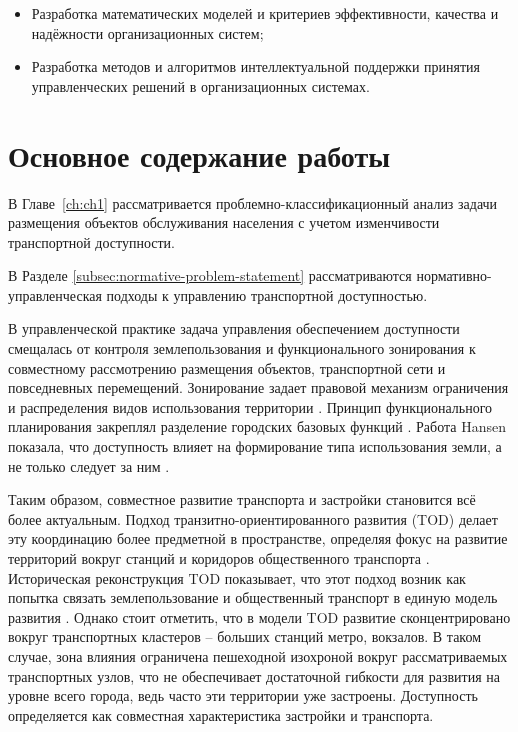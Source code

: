 \begin{itemize}
	\item[2.] Разработка математических моделей и критериев эффективности, качества и надёжности организационных систем;
	\item[9.] Разработка методов и алгоритмов интеллектуальной поддержки принятия управленческих решений в организационных системах.
\end{itemize}










\newpage
\section*{Основное содержание работы}

В Главе~\ref{ch:ch1} рассматривается проблемно-классификационный анализ задачи размещения объектов обслуживания населения с учетом изменчивости транспортной доступности.

В Разделе \ref{subsec:normative-problem-statement} рассматриваются  нормативно-управленческая подходы к управлению транспортной доступностью.

В управленческой практике задача управления обеспечением доступности смещалась от контроля землепользования и функционального зонирования к совместному рассмотрению размещения объектов, транспортной сети и повседневных перемещений. Зонирование задает правовой механизм ограничения и распределения видов использования территории \cite{britannicaZoning}. Принцип функционального планирования закреплял разделение городских базовых функций \cite{gold1998charter}. Работа Hansen показала, что доступность влияет на формирование типа использования земли, а не только следует за ним \cite{hansen1959accessibility}.

Таким образом, совместное развитие транспорта и застройки становится всё более актуальным. Подход транзитно-ориентированного развития (TOD) делает эту координацию более предметной в пространстве, определяя фокус на развитие территорий вокруг станций и коридоров общественного транспорта \cite{worldbankTod3v}. Историческая реконструкция TOD показывает, что этот подход возник как попытка связать землепользование и общественный транспорт в единую модель развития \cite{carlton2009tod}. Однако стоит отметить, что в модели TOD развитие сконцентрировано вокруг транспортных кластеров -- больших станций метро, вокзалов. В таком случае, зона влияния ограничена пешеходной изохроной вокруг рассматриваемых транспортных узлов, что не обеспечивает достаточной гибкости для развития на уровне всего города, ведь часто эти территории уже застроены. Доступность определяется как совместная характеристика застройки и транспорта.

